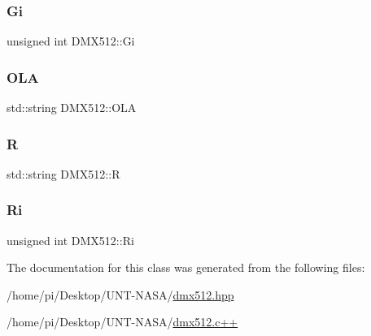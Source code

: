 \mbox{\label{classDMX512_afa6a4f81386fd8c8fc86a156fc7018e1}} 
\subsubsection{\texorpdfstring{Gi}{Gi}}
{\footnotesize\ttfamily unsigned int D\+M\+X512\+::\+Gi}

\mbox{\label{classDMX512_a266eca0f1d1836e8122edd5efeae3c84}} 
\subsubsection{\texorpdfstring{O\+LA}{OLA}}
{\footnotesize\ttfamily std\+::string D\+M\+X512\+::\+O\+LA}

\mbox{\label{classDMX512_a231a85f100b6b81a202143d858ed26d1}} 
\subsubsection{\texorpdfstring{R}{R}}
{\footnotesize\ttfamily std\+::string D\+M\+X512\+::R}

\mbox{\label{classDMX512_aa5ffc37b24d0a79180d13663a5cf8379}} 
\subsubsection{\texorpdfstring{Ri}{Ri}}
{\footnotesize\ttfamily unsigned int D\+M\+X512\+::\+Ri}



The documentation for this class was generated from the following files\+:\begin{DoxyCompactItemize}
\item 
/home/pi/\+Desktop/\+U\+N\+T-\/\+N\+A\+S\+A/\hyperlink{dmx512_8hpp}{dmx512.\+hpp}\item 
/home/pi/\+Desktop/\+U\+N\+T-\/\+N\+A\+S\+A/\hyperlink{dmx512_8c_09_09}{dmx512.\+c++}\end{DoxyCompactItemize}
